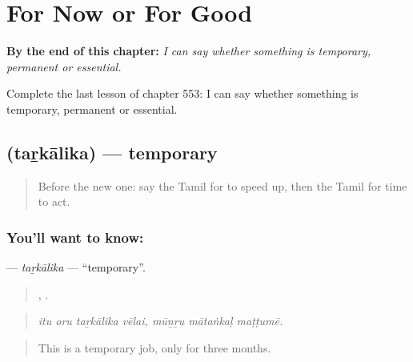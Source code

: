 
\chapter{For Now or For Good}
\label{ch:ta-for-now-or-for-good}

\begin{chapteropening}
\textbf{By the end of this chapter:} \emph{I can say whether something is temporary, permanent or essential.}

Complete the last lesson of chapter 553: I can say whether something is temporary, permanent or essential.
\end{chapteropening}

\section[\texorpdfstring{\ta{தற்காலிக} (taṟkālika)}{தற்காலிக (taṟkālika)}]{ (taṟkālika) — temporary}

\label{lesson:TA-C553-tarkalika}



\begin{quote}
Before the new one: say the Tamil for to speed up, then the Tamil for time to act.
\end{quote}

\subsection*{You'll want to know: }
\textbf{} — \emph{taṟkālika} — \textquotedblleft{}temporary\textquotedblright{}.

\begin{quote}
   ,   .
\end{quote}

\begin{quote}
\emph{itu oru taṟkālika vēlai, mūṉṟu mātaṅkaḷ maṭṭumē.}
\end{quote}

\begin{quote}
This is a temporary job, only for three months.
\end{quote}

